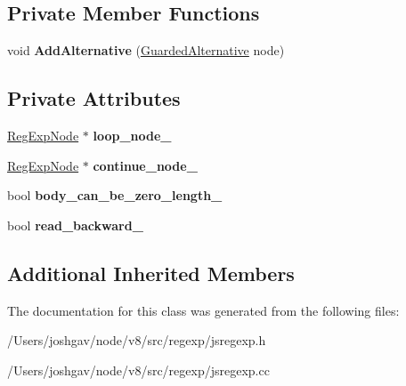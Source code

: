 \subsection*{Private Member Functions}
\begin{DoxyCompactItemize}
\item 
void {\bfseries Add\+Alternative} (\hyperlink{classv8_1_1internal_1_1_guarded_alternative}{Guarded\+Alternative} node)\hypertarget{classv8_1_1internal_1_1_loop_choice_node_add02d61e574666005102460c4d8d4e73}{}\label{classv8_1_1internal_1_1_loop_choice_node_add02d61e574666005102460c4d8d4e73}

\end{DoxyCompactItemize}
\subsection*{Private Attributes}
\begin{DoxyCompactItemize}
\item 
\hyperlink{classv8_1_1internal_1_1_reg_exp_node}{Reg\+Exp\+Node} $\ast$ {\bfseries loop\+\_\+node\+\_\+}\hypertarget{classv8_1_1internal_1_1_loop_choice_node_aaeb891ce3671739f29e79e0039e4e21c}{}\label{classv8_1_1internal_1_1_loop_choice_node_aaeb891ce3671739f29e79e0039e4e21c}

\item 
\hyperlink{classv8_1_1internal_1_1_reg_exp_node}{Reg\+Exp\+Node} $\ast$ {\bfseries continue\+\_\+node\+\_\+}\hypertarget{classv8_1_1internal_1_1_loop_choice_node_a6f56b629214ceaf564e6eeaa293990ac}{}\label{classv8_1_1internal_1_1_loop_choice_node_a6f56b629214ceaf564e6eeaa293990ac}

\item 
bool {\bfseries body\+\_\+can\+\_\+be\+\_\+zero\+\_\+length\+\_\+}\hypertarget{classv8_1_1internal_1_1_loop_choice_node_a9b6fbfcfe5392e8c96e361f05f561904}{}\label{classv8_1_1internal_1_1_loop_choice_node_a9b6fbfcfe5392e8c96e361f05f561904}

\item 
bool {\bfseries read\+\_\+backward\+\_\+}\hypertarget{classv8_1_1internal_1_1_loop_choice_node_a29915413e847420070832f70d5115600}{}\label{classv8_1_1internal_1_1_loop_choice_node_a29915413e847420070832f70d5115600}

\end{DoxyCompactItemize}
\subsection*{Additional Inherited Members}


The documentation for this class was generated from the following files\+:\begin{DoxyCompactItemize}
\item 
/\+Users/joshgav/node/v8/src/regexp/jsregexp.\+h\item 
/\+Users/joshgav/node/v8/src/regexp/jsregexp.\+cc\end{DoxyCompactItemize}
